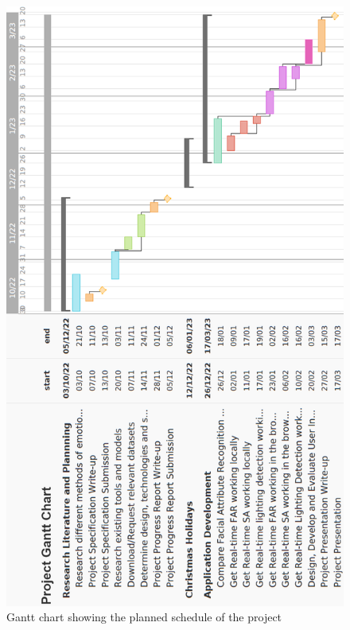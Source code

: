 \documentclass[12pt, a4paper]{article}
\begin{document}
\begin{appendices}
\begin{figure}[H]
    \centering
    \includegraphics[scale=0.55]{images/gantt1.png}
    \caption{Gantt chart showing the planned schedule of the project}
    \label{fig:gantt1}
\end{figure}


\end{appendices}
\end{document}
